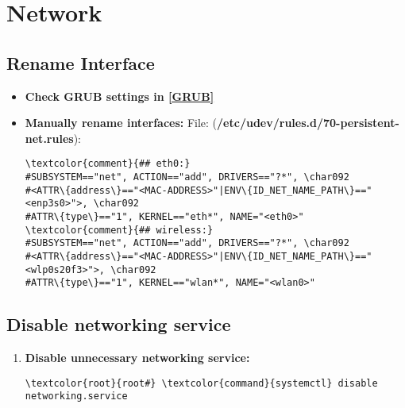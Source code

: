 \documentclass[10pt, a4paper, onecolumn, openany]{book} %
\begin{document}
\chapter{Network}
\section{Rename Interface}
\begin{itemize}
    \item \textbf{Check GRUB settings in \underline{\textbf{\ref{GRUB}}}}
    \item \textbf{Manually rename interfaces:}
\newline File: (\textcolor{file}{\textbf{/etc/udev/rules.d/70-persistent-net.rules}}):
\begin{Verbatim}[commandchars=\\\{\}]
\textcolor{comment}{## eth0:}
#SUBSYSTEM=="net", ACTION=="add", DRIVERS=="?*", \char092
#<ATTR\{address\}=="<MAC-ADDRESS>"|ENV\{ID_NET_NAME_PATH\}=="<enp3s0>">, \char092
#ATTR\{type\}=="1", KERNEL=="eth*", NAME="<eth0>"
\textcolor{comment}{## wireless:}
#SUBSYSTEM=="net", ACTION=="add", DRIVERS=="?*", \char092
#<ATTR\{address\}=="<MAC-ADDRESS>"|ENV\{ID_NET_NAME_PATH\}=="<wlp0s20f3>">, \char092
#ATTR\{type\}=="1", KERNEL=="wlan*", NAME="<wlan0>"
\end{Verbatim}
\end{itemize}
\section{Disable networking service}
\begin{enumerate}
    \item \textbf{Disable unnecessary networking service:}
\begin{Verbatim}[commandchars=\\\{\}]
\textcolor{root}{root#} \textcolor{command}{systemctl} disable networking.service
\end{Verbatim}
\end{enumerate}
\end{document}
